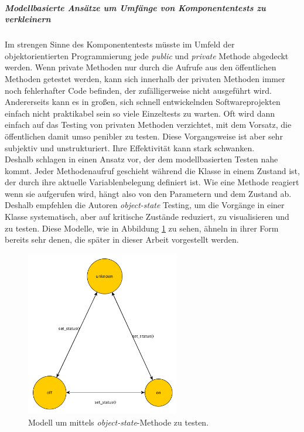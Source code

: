 \subparagraph{Modellbasierte Ansätze um Umfänge von Komponententests zu verkleinern}
Im strengen Sinne des Komponententests müsste im Umfeld der objektorientierten Programmierung jede \textit{public} und \textit{private} Methode abgedeckt werden. Wenn private Methoden nur durch die Aufrufe aus den öffentlichen Methoden getestet werden, kann sich innerhalb der privaten Methoden immer noch fehlerhafter Code befinden, der zufälligerweise nicht ausgeführt wird. Andererseits kann es in großen, sich schnell entwickelnden Softwareprojekten einfach nicht praktikabel sein so viele Einzeltests zu warten. Oft wird dann einfach auf das Testing von privaten Methoden verzichtet, mit dem Vorsatz, die öffentlichen damit umso penibler zu testen. Diese Vorgangsweise ist aber sehr subjektiv und unstrukturiert. Ihre Effektivität kann stark schwanken.\\
Deshalb schlagen \citeauthor{linz_testing_2014} in \cite{linz_testing_2014} einen Ansatz vor, der dem modellbasierten Testen nahe kommt. Jeder Methodenaufruf geschieht während die Klasse in einem Zustand ist, der durch ihre aktuelle Variablenbelegung definiert ist. Wie eine Methode reagiert wenn sie aufgerufen wird, hängt also von den Parametern und dem Zustand ab. Deshalb empfehlen die Autoren \textit{object-state} Testing, um die Vorgänge in einer Klasse systematisch, aber auf kritische Zustände reduziert, zu visualisieren und zu testen. Diese Modelle, wie in Abbildung \ref{fig:mbt_unit} zu sehen, ähneln in ihrer Form bereits sehr denen, die später in dieser Arbeit vorgestellt werden.

\begin{figure}[h] 
  \centering
     \includegraphics[width=0.6\textwidth]{figures/mbt_unit.png}
  \caption{Modell um mittels \textit{object-state}-Methode zu testen.}
  \label{fig:mbt_unit}
\end{figure}

